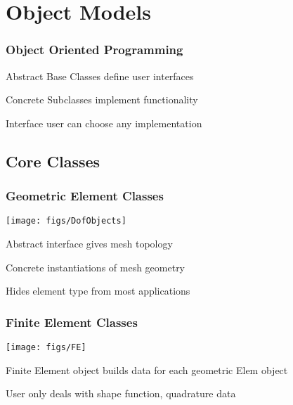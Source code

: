 
\section{Object Models}
      
\begin{frame}[<+->]
\frametitle{Object Oriented Programming}

    \item Abstract Base Classes define user interfaces
    \item Concrete Subclasses implement functionality
    \item Interface user can choose any implementation
  \royitemizeend
\end{frame}

\subsection{Core Classes}

\begin{frame}
\frametitle{Geometric Element Classes}

\begin{minipage}[h]{.45\textwidth}
\begin{center}
\texttt{[image: figs/DofObjects]}
\end{center}
\end{minipage}
\begin{minipage}[h]{.45\textwidth}
\royitemizebegin{}
\item Abstract interface gives mesh topology
\item Concrete instantiations of mesh geometry
\item Hides element type from most applications
\royitemizeend
\end{minipage}

\end{frame}

\begin{frame}
\frametitle{Finite Element Classes}

\begin{minipage}[h]{.45\textwidth}
\begin{center}
\texttt{[image: figs/FE]}
\end{center}
\end{minipage}
\begin{minipage}[h]{.45\textwidth}
\royitemizebegin{}
\item Finite Element object builds data for each geometric Elem object
\item User only deals with shape function, quadrature data
\royitemizeend
\end{minipage}

\end{frame}

